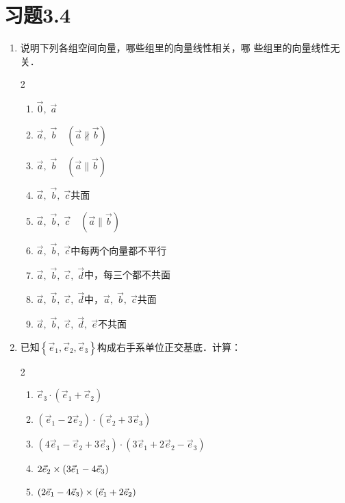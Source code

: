 \section*{习题3.4}

\begin{enumerate}
    \item 说明下列各组空间向量，哪些组里的向量线性相关，哪
    些组里的向量线性无关．
    \begin{multicols}{2}
\begin{enumerate}
    \item $\vec{0},\; \vec{a}$
    \item $\vec{a},\; \vec{b}\quad (\vec{a}\nparallel\vec{b})$
    \item $\vec{a},\; \vec{b}\quad (\vec{a}\parallel\vec{b})$
    \item $\vec{a},\; \vec{b},\; \vec{c}$共面
    \item $\vec{a},\; \vec{b},\; \vec{c}\quad (\vec{a}\parallel\vec{b})$
    \item $\vec{a},\; \vec{b},\; \vec{c}$中每两个向量都不平行
    \item $\vec{a},\; \vec{b},\; \vec{c},\; \vec{d}$中，每三个都不共面
    \item $\vec{a},\; \vec{b},\; \vec{c},\; \vec{d}$中，$\vec{a},\; \vec{b},\; \vec{c}$共面
    \item $\vec{a},\; \vec{b},\; \vec{c},\; \vec{d},\; \vec{e}$不共面
 \end{enumerate}           
    \end{multicols}

\item 已知$\left\{\vec{e}_1,\vec{e}_2,\vec{e}_3\right\}$构成右手系单位正交基底．计算：
\begin{multicols}{2}
    \begin{enumerate}
\item $\vec{e}_3\cdot \left(\vec{e}_1+\vec{e}_2\right)$
\item $\left(\vec{e}_1-2\vec{e}_2\right)\cdot \left(\vec{e}_2+3\vec{e}_3\right)$
\item $\left(4\vec{e}_1-\vec{e}_2+3\vec{e}_3\right)\cdot \left(3\vec{e}_1+2\vec{e}_2-\vec{e}_3\right)$
\item $2\vec{e}_2\times \left(3\vec{e}_1-4\vec{e}_3\right)$
\item $\left(2\vec{e}_1-4\vec{e}_3\right)\times \left(\vec{e}_1+2\vec{e}_2\right)$
 \end{enumerate}           
    \end{multicols}


\end{enumerate}
